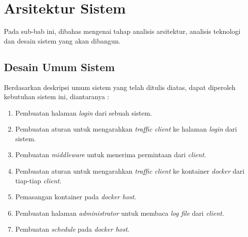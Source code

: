 \section{Arsitektur Sistem}
Pada sub-bab ini, dibahas mengenai tahap analisis arsitektur, analisis teknologi dan desain sistem yang akan dibangun.
\subsection{Desain Umum Sistem}
\indent Berdasarkan deskripsi umum sistem yang telah ditulis diatas, dapat diperoleh kebutuhan sistem ini, diantaranya :
\begin{enumerate}
	\item Pembuatan halaman \textit{login} dari sebuah sistem.
	\item Pembuatan aturan untuk mengarahkan \textit{traffic client} ke halaman \textit{login} dari sistem.
	\item Pembuatan \textit{middleware} untuk menerima permintaan dari \textit{client}.
	\item Pembuatan aturan untuk mengarahkan \textit{traffic client} ke kontainer \textit{docker} dari tiap-tiap \textit{client}.
	\item Pemasangan kontainer pada \textit{docker host}.
	\item Pembuatan halaman \textit{administrator} untuk membaca \textit{log file} dari \textit{client}.
	\item Pembuatan \textit{schedule} pada \textit{docker host}.
\end{enumerate} 

